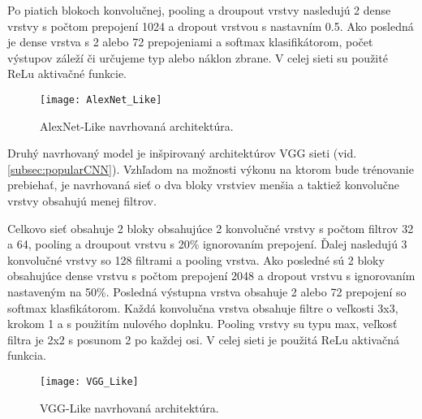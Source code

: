 Po piatich blokoch konvolučnej, pooling a droupout vrstvy nasledujú 2 dense vrstvy s počtom prepojení 1024 a dropout vrstvou s nastavním 0.5.
Ako posledná je dense vrstva s 2 alebo 72 prepojeniami a softmax klasifikátorom, počet výstupov záleží či určujeme typ alebo náklon zbrane.
V celej sieti su použité ReLu aktivačné funkcie.

\begin{figure}[H]
    \centering
    \texttt{[image: AlexNet\_Like]}
    \caption{AlexNet-Like navrhovaná architektúra.}
    \label{pic:kNN}
\end{figure}


Druhý navrhovaný model je inšpirovaný architektúrov VGG sieti (vid. \ref{subsec:popularCNN}).
Vzhľadom na možnosti výkonu na ktorom bude trénovanie prebiehať, je navrhovaná sieť o dva bloky vrstviev menšia a taktiež konvolučne vrstvy obsahujú menej filtrov.

Celkovo sieť obsahuje 2 bloky obsahujúce 2 konvolučné vrstvy s počtom filtrov 32 a 64, pooling a droupout vrstvu s 20\% ignorovaním prepojení.
Ďalej nasledujú 3 konvolučné vrstvy so 128 filtrami a pooling vrstva.
Ako posledné sú 2 bloky obsahujúce dense vrstvu s počtom prepojení 2048 a dropout vrstvu s ignorovaním nastaveným na 50\%.
Posledná výstupna vrstva obsahuje 2 alebo 72 prepojení so softmax klasfikátorom.
Každá konvolučna vrstva obsahuje filtre o veľkosti 3x3, krokom 1 a s použitím nulového doplnku.
Pooling vrstvy su typu max, veľkosť filtra je 2x2 s posunom 2 po každej osi.
V celej sieti je použitá ReLu aktivačná funkcia.

\begin{figure}[H]
    \centering
    \texttt{[image: VGG\_Like]}
    \caption{VGG-Like navrhovaná architektúra.}
    \label{pic:kNN}
\end{figure}
